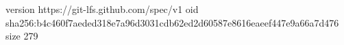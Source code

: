version https://git-lfs.github.com/spec/v1
oid sha256:b4c460f7aeded318e7a96d3031cdb62ed2d60587e8616eaeef447e9a66a7d476
size 279
